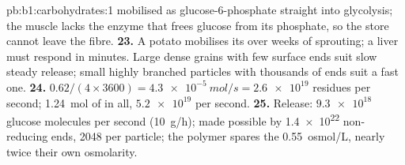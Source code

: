 \begin{solution}{pb:b1:carbohydrates:1}
mobilised as glucose-6-phosphate straight into glycolysis; the muscle
lacks the enzyme that frees glucose from its phosphate, so the store
cannot leave the fibre.
\textbf{23.} A potato mobilises its  over weeks of sprouting; a
liver must respond in minutes. Large dense grains with few surface
ends suit slow steady release; small highly branched particles with
thousands of ends suit a fast one.
\textbf{24.} $0.62/(4\times 3600) = \qty{4.3e-5}{mol/s} = \num{2.6e19}$
residues per second; \qty{1.24}{mol} of  in all, $\num{5.2e19}$ per
second.
\textbf{25.} Release: $\num{9.3e18}$ glucose molecules per second
(\qty{10}{g/h}); made possible by \num{1.4e22} non-reducing ends,
\num{2048} per particle; the polymer spares the 
\qty{0.55}{osmol/L}, nearly twice their own osmolarity.
\end{solution}
